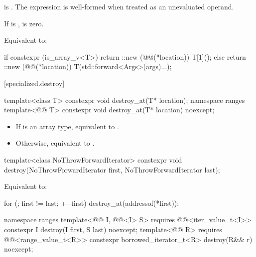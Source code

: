 \begin{itemdescr}
\pnum
\constraints
{} is .
The expression 
is well-formed when treated as an unevaluated operand.

\pnum
\mandates
If  is ,  is zero.

\pnum
\effects
Equivalent to:
\begin{codeblock}
if constexpr (is_array_v<T>)
  return ::new (@@(*location)) T[1]();
else
  return ::new (@@(*location)) T(std::forward<Args>(args)...);
\end{codeblock}
\end{itemdescr}

[specialized.destroy]{}

%
\begin{itemdecl}
template<class T>
  constexpr void destroy_at(T* location);
namespace ranges {
  template<@@ T>
    constexpr void destroy_at(T* location) noexcept;
}
\end{itemdecl}

\begin{itemdescr}
\pnum
\effects
\begin{itemize}
\item If  is an array type, equivalent to
  .
\item Otherwise, equivalent to
  .
\end{itemize}
\end{itemdescr}

%
\begin{itemdecl}
template<class NoThrowForwardIterator>
  constexpr void destroy(NoThrowForwardIterator first, NoThrowForwardIterator last);
\end{itemdecl}

\begin{itemdescr}
\pnum
\effects
Equivalent to:
\begin{codeblock}
for (; first != last; ++first)
  destroy_at(addressof(*first));
\end{codeblock}
\end{itemdescr}

%
\begin{itemdecl}
namespace ranges {
  template<@@ I, @@<I> S>
    requires @@<iter_value_t<I>>
    constexpr I destroy(I first, S last) noexcept;
  template<@@ R>
    requires @@<range_value_t<R>>
    constexpr borrowed_iterator_t<R> destroy(R&& r) noexcept;
}
\end{itemdecl}


